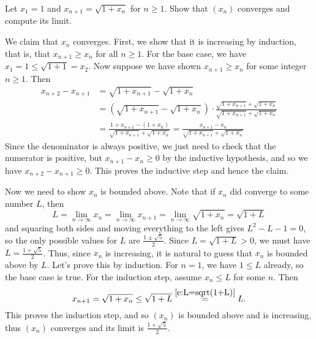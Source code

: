 \documentclass[11pt,dvipsnames]{book}
\numberwithin{figure}{section} %
\numberwithin{table}{section} %
\begin{document}
\begin{exercise}
 Let $x_{1}=1$ and $x_{n+1}=\sqrt{1+x_{n}}$ for $n \geq 1$. Show that $(x_n)$ converges and compute its limit.

\begin{solution}
We claim that $x_n$ converges. First, we show that it is increasing by induction, that is, that $x_{n+1}\geq x_{n}$ for all $n\geq 1$. For the base case, we have $x_{1}=1\leq \sqrt{1+1}=x_{2}$. Now suppose we have shown  $x_{n+1}\geq x_{n}$ for some integer $n\geq 1$. Then
\begin{align*}
x_{n+2} -x_{n+1}
& =\sqrt{1+x_{n+1}}-\sqrt{1+x_{n}}\\
& = \left(\sqrt{1+x_{n+1}}-\sqrt{1+x_{n}}\right)\cdot\frac{\sqrt{1+x_{n+1}}+\sqrt{1+x_{n}}}{\sqrt{1+x_{n+1}}+\sqrt{1+x_{n}}}\\
& = \frac{1+x_{n+1}-(1+x_{n})}{\sqrt{1+x_{n+1}}+\sqrt{1+x_{n}}}
 = \frac{x_{n+1}-x_{n}}{\sqrt{1+x_{n+1}}+\sqrt{1+x_{n}}}
\end{align*}
Since the denominator is always positive, we just need to check that the numerator is positive, but $x_{n+1}-x_{n}\geq 0$ by the inductive hypothesis, and so we have $x_{n+2} -x_{n+1} \geq 0 $. This proves the inductive step and hence the claim.

Now we need to show $x_n$ is bounded above. Note that if $x_n$ did converge to some number $L$, then
\begin{equation}
\label{e:L=sqrt(1+L)}
L=\lim_{n\rightarrow\infty}x_{n}
=\lim_{n\rightarrow\infty}x_{n+1}
=\lim_{n\rightarrow\infty}\sqrt{1+x_{n}}
=\sqrt{1+L}
\end{equation}
and squaring both sides and moving everything to the left gives $L^2-L-1=0$, so the only possible values for $L$ are $\frac{1\pm\sqrt{5}}{2}$. Since $L=\sqrt{1+L}> 0$, we must have $L=\frac{1+\sqrt{5}}{2}$. Thus, since $x_n$ is increasing, it is natural to guess that $x_n$ is bounded above by $L$. Let's prove this by induction. For $n=1$, we have $1\leq L$ already, so the base case is true. For the induction step, assume $x_{n}\leq L$ for some $n$. Then
\[
x_{n+1}=\sqrt{1+x_{n}}\leq \sqrt{1+L}\stackrel{\eqref{e:L=sqrt(1+L)}}{=}L.\]
This proves the induction step, and so $(x_n)$ is bounded above and is increasing, thus $(x_n)$ converges and its limit is $\frac{1+\sqrt{5}}{2}$.
\end{solution}

\end{exercise}
\end{document}
